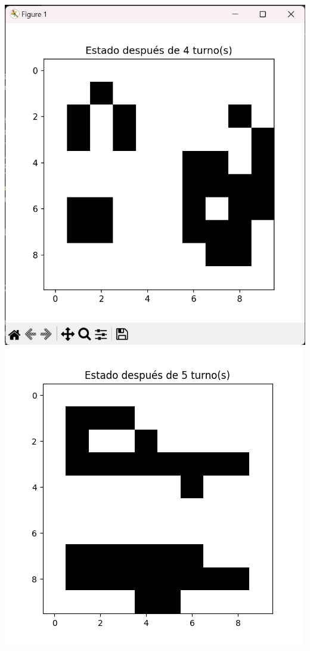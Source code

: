 \begin{itemize}
\begin{center}
        \includegraphics[scale=0.4]{IMA/ejemplosJuegoVida/ejemplo 1.5.png}
        \includegraphics[scale=0.4]{IMA/ejemplosJuegoVida/ejemplo 1.6.png}
    \end{center}


\end{itemize}
